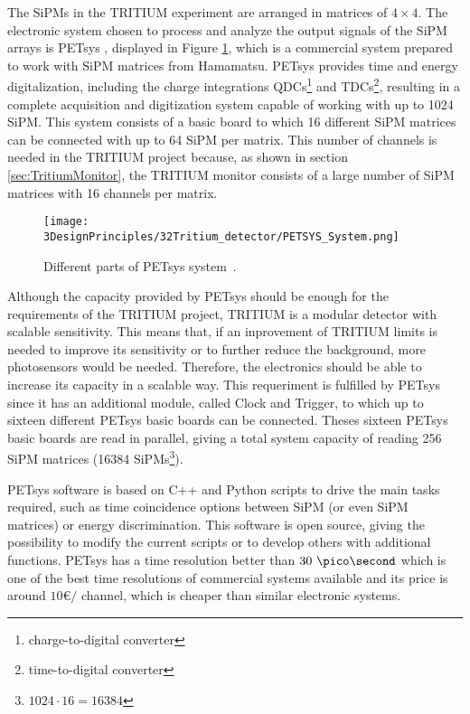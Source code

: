 The SiPMs in the TRITIUM experiment are arranged in matrices of $4\times 4$. The electronic system chosen to process and analyze the output signals of the SiPM arrays is PETsys \cite{PETSYS}, displayed in Figure \ref{fig:PETSYS}, which is a commercial system prepared to work with SiPM matrices from Hamamatsu. PETsys provides time and energy digitalization, including the charge integrations QDCs\footnote{charge-to-digital converter} and TDCs\footnote{time-to-digital converter}, resulting in a complete acquisition and digitization system capable of working with up to 1024 SiPM. This system consists of a basic board to which 16 different SiPM matrices can be connected with up to 64 SiPM per matrix. This number of channels is needed in the TRITIUM project because, as shown in section \ref{sec:TritiumMonitor}, the TRITIUM monitor consists of a large number of SiPM matrices with 16 channels per matrix.

\begin{figure}[h]
\centering
\texttt{[image: 3DesignPrinciples/32Tritium\_detector/PETSYS\_System.png]}
\caption{Different parts of PETsys system\label{fig:PETSYS}~\cite{PETSYS}.}
\end{figure}
Although the capacity provided by PETsys should be enough for the requirements of the TRITIUM project, TRITIUM is a modular detector with scalable sensitivity. This means that, if an inprovement of TRITIUM limits is needed to improve its sensitivity or to further reduce the background, more photosensors would be needed. Therefore, the electronics should be able to increase its capacity in a scalable way. This requeriment is fulfilled by PETsys since it has an additional module, called Clock and Trigger, to which up to sixteen different PETsys basic boards can be connected. Theses sixteen PETsys basic boards are read in parallel, giving a total system capacity of reading 256 SiPM matrices (16384 SiPMs\footnote{$1024\cdot{}16 = 16384$}). 

PETsys software is based on C++ and Python scripts to drive the main tasks required, such as time coincidence options between SiPM (or even SiPM matrices) or energy discrimination. This software is open source, giving the possibility to modify the current scripts or to develop others with additional functions. PETsys has a time resolution better than $30~\pico\second$ which is one of the best time resolutions of commercial systems available and its price is around $10$\euro$/$ channel, which is cheaper than similar electronic systems.

